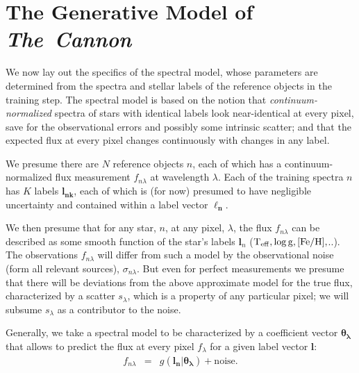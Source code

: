 \documentclass[12pt, preprint]{aastex}
\newcommand{\set}[1]{\bm{#1}}
\newcommand{\teff}{\mbox{$\rm T_{eff}$}}
\newcommand{\feh}{\mbox{$\rm [Fe/H]$}}
\newcommand{\logg}{\mbox{$\rm \log g$}}
\newcommand{\tc}{\textsl{The~Cannon}}
\newcommand{\noise}{\sigma_{n\lambda}}
\newcommand{\scatter}{s_{\lambda}}
\begin{document}
\section{The Generative Model of \tc}
\label{sec:spectralmodel}

We now lay out the specifics of the spectral model, whose parameters are determined 
from the spectra and stellar labels of the reference objects in the training step.
The spectral model is based on the notion that \textit{continuum-normalized} spectra of
stars with identical labels look near-identical at every pixel, save for the observational errors
and possibly some intrinsic scatter; and that the expected  flux at every pixel changes continuously
with changes in any label.

We presume there are $N$ reference objects $n$, each of which has
a continuum-normalized flux measurement $f_{n\lambda}$ at wavelength
$\lambda$. Each of the training spectra $n$ has $K$ labels $\boldsymbol{l_{nk}}$, each of which
is (for now) presumed to have negligible uncertainty and contained within a label vector $\boldsymbol{\ell_n}$.

We then presume that for any star, $n$, at any pixel, $\lambda$,
the flux $f_{n\lambda}$  can be described as some smooth function of the star's labels $\set{l}_n$
($\teff,\logg,\feh,$..). The observations $f_{n\lambda}$ will differ from such a model by the observational noise (form all relevant sources), $\noise$. But even for perfect measurements we presume that there will be
deviations from the above approximate model for the true flux, characterized by a scatter $\scatter$,
which is a property of any particular pixel; we will subsume $\scatter$ as a contributor to the noise.


Generally, we take a spectral model to be characterized by a coefficient vector $\boldsymbol{\theta_\lambda}$
that allows to predict the flux at every pixel $f_\lambda$ for a given label vector 
$\boldsymbol{l}$:  
\begin{eqnarray}
f_{n\lambda} &=&
g(\boldsymbol{l_n} |  \boldsymbol{\theta_\lambda}) + \mbox{noise}.
 \label{eq:specmodel}
\end{eqnarray}
\end{document}

